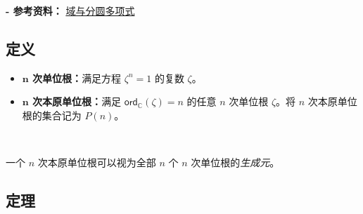 \textbf{- 参考资料：}
\href{https://e.math.cornell.edu/people/belk/numbertheory/CyclotomicPolynomials.pdf}{域与分圆多项式}~\cite{cyclotomic-polynomial}


\subsection{定义}
\label{subsec:roots-def}
\begin{tcolorbox}[title={\textbf{\tboxdef{\ref*{subsec:roots-def}} 单位根的定义}}]
\begin{itemize}
\item \textbf{$\bm{n}$ 次单位根：}满足方程 $\zeta^n = 1$ 的复数 $\zeta$。
\item \textbf{$\bm{n}$ 次本原单位根：}满足 $\textsf{ord}_{\mathbb{C}}(\zeta) = n$ 的任意 $n$ 次单位根 $\zeta$。将 $n$ 次本原单位根的集合记为 $P(n)$。
\end{itemize}

$ $

一个 $n$ 次本原单位根可以视为全部 $n$ 个 $n$ 次单位根的\textit{生成元}。
\end{tcolorbox}

\subsection{定理}
\label{subsec:roots-theorem}


